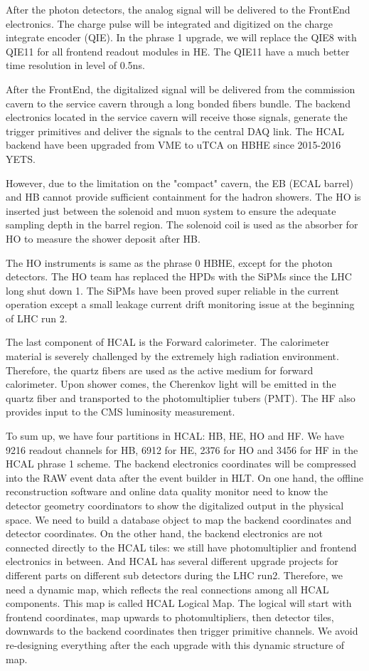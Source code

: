 After the photon detectors, the analog signal will be delivered to the FrontEnd electronics. The charge pulse will be integrated and digitized on the charge integrate encoder (QIE). In the phrase 1 upgrade, we will replace the QIE8 with QIE11 for all frontend readout modules in HE. The QIE11 have a much better time resolution in level of 0.5ns. 

After the FrontEnd, the digitalized signal will be delivered from the commission cavern to the service cavern through a long bonded fibers bundle. The backend electronics located in the service cavern will receive those signals, generate the trigger primitives and deliver the signals to the central DAQ link. The HCAL backend have been upgraded from VME to uTCA on HBHE since 2015-2016 YETS\cite{CMS:2012tda}. 

However, due to the limitation on the "compact" cavern, the EB (ECAL barrel) and HB cannot provide sufficient containment for the hadron showers. The HO is inserted just between the solenoid and muon system to ensure the adequate sampling depth in the barrel region. The solenoid coil is used as the absorber for HO to measure the shower deposit after HB. 

The HO instruments is same as the phrase 0 HBHE, except for the photon detectors. The HO team has replaced the HPDs with the SiPMs since the LHC long shut down 1. The SiPMs have been proved super reliable in the current operation except a small leakage current drift monitoring issue at the beginning of LHC run 2. 

The last component of HCAL is the Forward calorimeter. The calorimeter material is severely challenged by the extremely high radiation environment. Therefore, the quartz fibers are used as the active medium for forward calorimeter. Upon shower comes, the Cherenkov light will be emitted in the quartz fiber and transported to the photomultiplier tubers (PMT). The HF also provides input to the CMS luminosity measurement. 

To sum up, we have four partitions in HCAL: HB, HE, HO and HF. We have 9216 readout channels for HB, 6912 for HE, 2376 for HO and 3456 for HF in the HCAL phrase 1 scheme. The backend electronics coordinates will be compressed into the RAW event data after the event builder in HLT. On one hand, the offline reconstruction software and online data quality monitor need to know the detector geometry coordinators to show the digitalized output in the physical space. We need to build a database object to map the backend coordinates and detector coordinates. On the other hand, the backend electronics are not connected directly to the HCAL tiles: we still have photomultiplier and frontend electronics in between. And HCAL has several different upgrade projects for different parts on different sub detectors during the LHC run2. Therefore, we need a dynamic map, which reflects the real connections among all HCAL components. This map is called HCAL Logical Map. The logical will start with frontend coordinates, map upwards to photomultipliers, then detector tiles, downwards to the backend coordinates then trigger primitive channels. We avoid re-designing everything after the each upgrade with this dynamic structure of map. 

